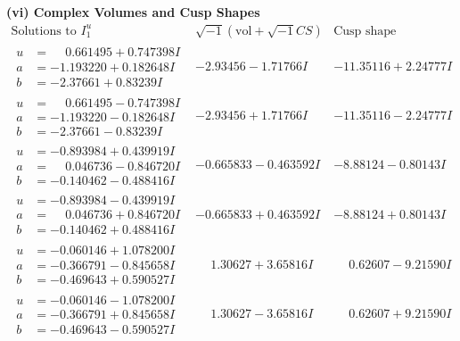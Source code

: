 \documentclass[1p]{elsarticle_modified}
\theoremstyle{definition}
\newcommand{\I}{\sqrt{-1}}
\begin{document}
\newpage\flushleft \textbf{(vi) Complex Volumes and Cusp Shapes}
$$\begin{array}{c|c|c}  
\text{Solutions to }I^u_{1}& \I (\text{vol} + \sqrt{-1}CS) & \text{Cusp shape}\\
 \hline 
\begin{aligned}
u &= \phantom{-}0.661495 + 0.747398 I \\
a &= -1.193220 + 0.182648 I \\
b &= -2.37661 + 0.83239 I\end{aligned}
 & -2.93456 - 1.71766 I & -11.35116 + 2.24777 I \\ \hline\begin{aligned}
u &= \phantom{-}0.661495 - 0.747398 I \\
a &= -1.193220 - 0.182648 I \\
b &= -2.37661 - 0.83239 I\end{aligned}
 & -2.93456 + 1.71766 I & -11.35116 - 2.24777 I \\ \hline\begin{aligned}
u &= -0.893984 + 0.439919 I \\
a &= \phantom{-}0.046736 - 0.846720 I \\
b &= -0.140462 - 0.488416 I\end{aligned}
 & -0.665833 - 0.463592 I & -8.88124 - 0.80143 I \\ \hline\begin{aligned}
u &= -0.893984 - 0.439919 I \\
a &= \phantom{-}0.046736 + 0.846720 I \\
b &= -0.140462 + 0.488416 I\end{aligned}
 & -0.665833 + 0.463592 I & -8.88124 + 0.80143 I \\ \hline\begin{aligned}
u &= -0.060146 + 1.078200 I \\
a &= -0.366791 - 0.845658 I \\
b &= -0.469643 + 0.590527 I\end{aligned}
 & \phantom{-}1.30627 + 3.65816 I & \phantom{-}0.62607 - 9.21590 I \\ \hline\begin{aligned}
u &= -0.060146 - 1.078200 I \\
a &= -0.366791 + 0.845658 I \\
b &= -0.469643 - 0.590527 I\end{aligned}
 & \phantom{-}1.30627 - 3.65816 I & \phantom{-}0.62607 + 9.21590 I \\ \hline\begin{aligned}

\end{aligned}
\end{array}$$
\end{document}
